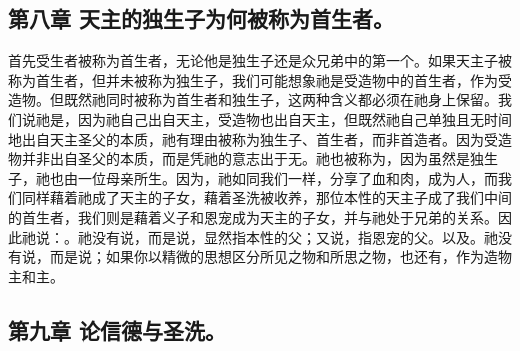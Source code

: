 
\subsection{第八章 天主的独生子为何被称为首生者。}

首先受生者被称为首生者，无论他是独生子还是众兄弟中的第一个。如果天主子被称为首生者，但并未被称为独生子，我们可能想象祂是受造物中的首生者，作为受造物。但既然祂同时被称为首生者和独生子，这两种含义都必须在祂身上保留。我们说祂是，因为祂自己出自天主，受造物也出自天主，但既然祂自己单独且无时间地出自天主圣父的本质，祂有理由被称为独生子、首生者，而非首造者。因为受造物并非出自圣父的本质，而是凭祂的意志出于无。祂也被称为，因为虽然是独生子，祂也由一位母亲所生。因为，祂如同我们一样，分享了血和肉，成为人，而我们同样藉着祂成了天主的子女，藉着圣洗被收养，那位本性的天主子成了我们中间的首生者，我们则是藉着义子和恩宠成为天主的子女，并与祂处于兄弟的关系。因此祂说：。祂没有说，而是说，显然指本性的父；又说，指恩宠的父。以及。祂没有说，而是说；如果你以精微的思想区分所见之物和所思之物，也还有，作为造物主和主。\par


\subsection{第九章 论信德与圣洗。}

